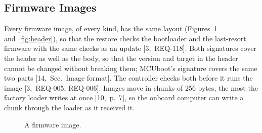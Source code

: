 \documentclass[11pt,a4paper]{article}
\begin{document}
\subsection{Firmware Images}
Every firmware image, of every kind, has the same layout
(Figures~\ref{fig:image} and~\ref{fig:header}), so that the restore checks the
bootloader and the last-resort firmware with the same checks as an update
\mbox{[3,~REQ-118]}. Both signatures cover the header as well as the body, so that
the version and target in the header cannot be changed without breaking them;
MCUboot's signature covers the same two parts [14,~Sec.~Image format]. The
controller checks both before it runs the image [3,~REQ-005, REQ-006]. Images
move in chunks of 256 bytes, the most the factory loader writes at once
[10,~p.~7], so the onboard computer can write a chunk through the loader as it
received it.

\begin{figure}[H]
\centering
{}
\caption{A firmware image.}
\label{fig:image}
\end{figure}
\end{document}
